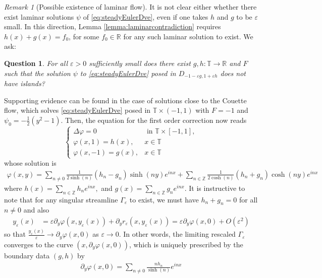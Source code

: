 \documentclass[11pt,reqno]{amsproc}
\newcommand{\R}{\mathbb{R}}
\newcommand{\Z}{\mathbb{Z}}
\newcommand{\ve}{\varepsilon}
\numberwithin{equation}{section}
\numberwithin{theorem}{section}
\newtheorem{question}{Question}
\numberwithin{prop}{section}
\numberwithin{cor}{section}
\numberwithin{lemma}{section}
\theoremstyle{remark}
\newtheorem*{remark}{Remark}
\theoremstyle{definition}
\begin{document}
\begin{remark}[Possible existence of laminar flow]

It is not clear either whether there exist laminar solutions $\psi$ of \eqref{eq:steadyEulerDve}, even if one takes $h$ and $g$ to be $\ve$ small. In this direction, Lemma \ref{lemma:laminarcontradiction} requires $h(x)+g(x) = f_0$, for some $f_0\in \R$ for any such laminar solution to exist.  We ask:%
\begin{question}
For all $\ve>0$ sufficiently small does there exist $g,h:\mathbb{T}\rightarrow \R$ and $F$ such that the solution $\psi$ to \eqref{eq:steadyEulerDve} posed in $D_{-1-\ve g,1+\ve h}$ does not have islands?
\end{question}
Supporting evidence can be found in the case of solutions close to the Couette flow, which solves \eqref{eq:steadyEulerDve} posed in $\mathbb{T}\times(-1,1)$ with $F=-1$ and  $\psi_0 = -\frac12(y^2-1)$. Then, the equation for the first order correction  now reads
\begin{equation*}
\begin{cases}
\Delta\varphi = 0 & \text{ in } \mathbb{T}\times [-1,1], \\
\varphi(x,1)=h(x), & x\in\mathbb{T} \\
\varphi(x,-1)= g(x), & x\in \mathbb{T}
\end{cases}
\end{equation*}
whose solution is 
\begin{align*}
\varphi(x,y) = \sum_{n\neq 0} \frac{1}{2\sinh(n)}\left( h_n - g_n \right) \sinh(ny)e^{inx} + \sum_{n\in \Z} \frac{1}{2\cosh(n)}\left( h_n + g_n \right) \cosh(ny)e^{inx}
\end{align*}
where $h(x) = \sum_{n\in \Z} h_ne^{inx},$ and  $g(x) = \sum_{n\in \Z} g_ne^{inx}.$
It is instructive to note that for any singular streamline $\Gamma_\ve$ to exist, we must have $h_n+g_n=0$ for all $n\neq 0$ and also
\begin{align*}
y_\ve(x) &= \ve \partial_y\varphi(x,y_\ve(x)) + \partial_yr_\ve(x,y_\ve(x)) = \ve \partial_y\varphi(x,0) + O(\ve^2)
\end{align*}
so that $\frac{y_\ve(x)}{\ve}\rightarrow \partial_y\varphi(x,0)$ as $\ve\rightarrow 0$. In other words, the limiting rescaled $\Gamma_\ve$ converges to the curve $(x,\partial_y\varphi(x,0))$, which is uniquely prescribed by the boundary data $(g,h)$ by 
\begin{align*}
\partial_y\varphi(x,0) = \sum_{n\neq0 } \frac{nh_n}{\sinh(n)}e^{inx}

\end{align*}
\end{remark}
\end{document}
